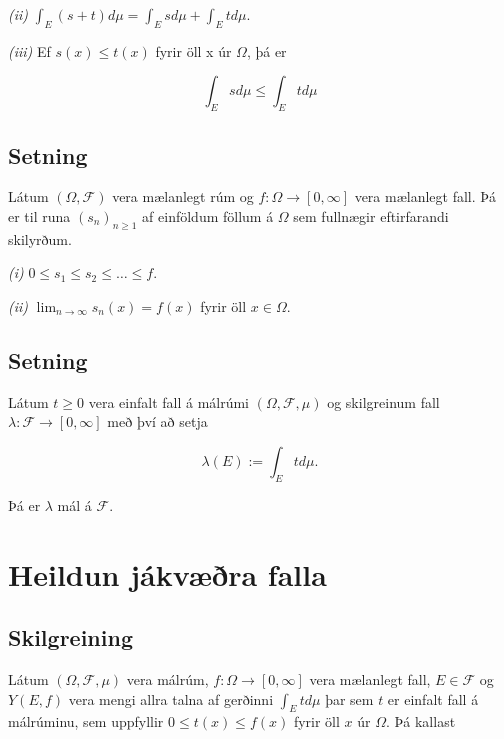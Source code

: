 \documentclass[]{book}
\begin{document}
\emph{(ii)} \(\int_E (s + t) d\mu = \int_E s d\mu + \int_E t d\mu\).

\emph{(iii)} Ef \(s(x) \leq t(x)\) fyrir öll x úr \(\Omega\), þá er

\[
\int_E s d\mu \leq \int_E t d\mu
\]

\hypertarget{setning-44}{%
\section{Setning}\label{setning-44}}

Látum \((\Omega, \mathcal F)\) vera mælanlegt rúm og \(f: \Omega \rightarrow [0, \infty]\) vera mælanlegt fall. Þá er til runa \((s_n)_{n\geq1}\) af einföldum föllum á \(\Omega\) sem fullnægir eftirfarandi skilyrðum.

\emph{(i)} \(0 \leq s_1 \leq s_2 \leq \dots \leq f.\)

\emph{(ii)} \(\lim_{n\rightarrow\infty}s_n(x) = f(x)\) fyrir öll \(x \in \Omega\).

\hypertarget{setning-45}{%
\section{Setning}\label{setning-45}}

Látum \(t\geq 0\) vera einfalt fall á málrúmi \((\Omega, \mathcal F, \mu)\) og skilgreinum fall \(\lambda: \mathcal F \rightarrow [0, \infty]\) með því að setja

\[
\lambda(E) := \int_E t  d\mu.
\]

Þá er \(\lambda\) mál á \(\mathcal F\).

\hypertarget{heildun-jakvra-falla}{%
\chapter{Heildun jákvæðra falla}\label{heildun-jakvra-falla}}

\hypertarget{skilgreining-21}{%
\section{Skilgreining}\label{skilgreining-21}}

Látum \((\Omega, \mathcal F, \mu)\) vera málrúm, \(f: \Omega \rightarrow [0, \infty]\) vera mælanlegt fall, \(E\in \mathcal F\) og \(Y(E,f)\) vera mengi allra talna af gerðinni \(\int_E t d\mu\) þar sem \(t\) er einfalt fall á málrúminu, sem uppfyllir \(0 \leq t(x) \leq f(x)\) fyrir öll \(x\) úr \(\Omega\). Þá kallast
\end{document}
